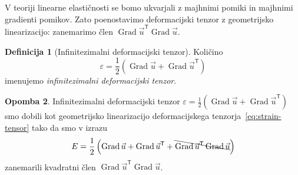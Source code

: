 \documentclass[12pt,a4paper,twoside]{article}
\theoremstyle{definition} %
\newtheorem{definicija}{Definicija}[section]
\newtheorem{opomba}[definicija]{Opomba}
\theoremstyle{plain} %
\numberwithin{equation}{section}
\newcommand{\T}{\mathsf{T}}
\newcommand{\Grad}{\operatorname{Grad}}
\newcommand{\eps}{\varepsilon}
\newcommand{\vu}{\vec{u}}
\begin{document}
V teoriji linearne elastičnosti se bomo ukvarjali z majhnimi pomiki in majhnimi
gradienti pomikov. Zato poenostavimo deformacijski tenzor z geometrijsko
linearizacijo: zanemarimo člen $\Grad \vu^\T \Grad \vu$.

\begin{definicija}[Infinitezimalni deformacijski tenzor]
  Količino
  \begin{equation}
    \eps = \frac{1}{2}(\Grad \vu + \Grad \vu^\T)
    \label{eq:eps}
  \end{equation}
  imenujemo \emph{infinitezimalni deformacijski tenzor}.
\end{definicija}
\begin{opomba}
  \label{op:linear-strain}
  Infinitezimalni deformacijski tenzor $\eps = \frac{1}{2}(\Grad \vu + \Grad \vu^\T)$ smo dobili kot
  geometrijsko linearizacijo deformacijskega tenzorja~\eqref{eq:strain-tensor} tako da smo v izrazu
  \begin{equation}
    E = \frac12\left( \Grad \vu + \Grad \vu^\T + \bcancel{\Grad \vu^\T \Grad \vu} \right)
  \end{equation}
  zanemarili kvadratni člen $\Grad \vu^\T \Grad \vu$.
\end{opomba}
\end{document}
